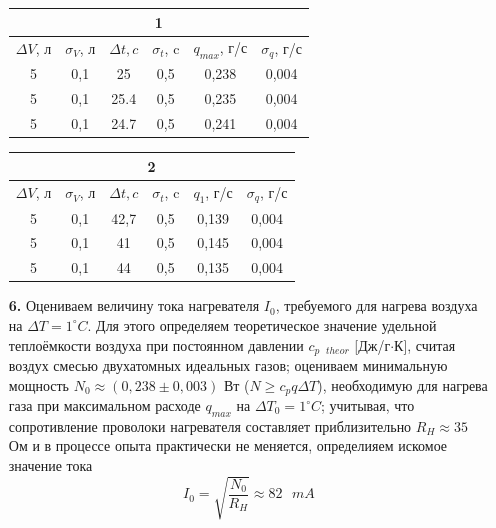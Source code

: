 \documentclass[a4paper, 12pt]{article}%
\begin{document}
\begin{enumerate}
\begin{center}
\begin{tabular}{|c|c|c|c|c|c|}
\hline
\multicolumn{6}{|c|}{1} \\
\hline
$\Delta V$, л & $\sigma_V$, л & $\Delta t, c$ & $\sigma_t$, c & $q_{max}$, г/с & $\sigma_q$, г/с \\ \hline
5             & 0,1           & 25            & 0,5           & 0,238    & 0,004           \\ \hline
5             & 0,1           & 25.4          & 0,5           & 0,235    & 0,004           \\ \hline
5             & 0,1           & 24.7          & 0,5           & 0,241    & 0,004           \\ \hline
\end{tabular}

\begin{tabular}{|c|c|c|c|c|c|}
\hline
\multicolumn{6}{|c|}{2} \\ \hline
$\Delta V$, л & $\sigma_V$, л & $\Delta t, c$ & $\sigma_t$, c & $q_{1}$, г/с & $\sigma_q$, г/с \\ \hline
5 & 0,1 & 42,7 & 0,5 & 0,139 & 0,004 \\ \hline
5 & 0,1 & 41   & 0,5 & 0,145 & 0,004 \\ \hline
5 & 0,1 & 44   & 0,5 & 0,135 & 0,004 \\ \hline
\end{tabular}


\end{center}
\item [\textbf{6.}] Оцениваем величину тока нагревателя $I_0$, требуемого для нагрева воздуха на $\Delta T = 1 ^{\circ}C$. Для этого определяем теоретическое значение удельной теплоёмкости воздуха при постоянном давлении $c_{p \text{ } theor}$ [Дж/г$\cdot$К], считая воздух смесью двухатомных идеальных газов; оцениваем минимальную мощность $N_0 \approx (0,238 \pm 0,003)$ Вт ($N \geq c_p q \Delta T$), необходимую для нагрева газа при максимальном расходе $q_{max}$ на $\Delta T_0 = 1^{\circ}C$; учитывая, что сопротивление проволоки нагревателя составляет приблизительно $R_H \approx 35$ Ом и в процессе опыта практически не меняется, определияем искомое значение тока $$I_0 = \sqrt{\dfrac{N_0}{R_H}} \approx 82 \text{ } mA$$  
\end{enumerate}
\end{document}
